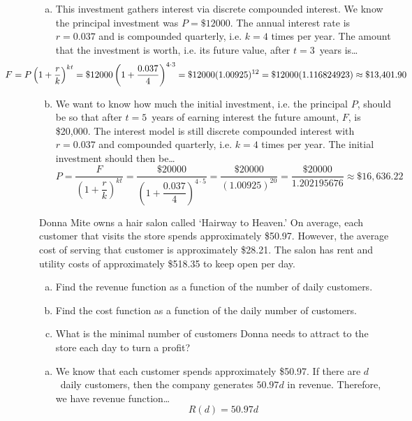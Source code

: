\documentclass[12pt,letterpaper]{exam}
\begin{document}
\begin{questions}
{\itshape
\sol 
\begin{enumerate}[(a)]
\item This investment gathers interest via discrete compounded interest. We know the principal investment was $P= \$12000$. The annual interest rate is $r= 0.037$ and is compounded quarterly, i.e. $k= 4$ times per year. The amount that the investment is worth, i.e. its future value, after $t= 3$~years is\dots
	\[
	\hspace{-2cm} F= P \left(1 + \dfrac{r}{k} \right)^{kt}= \$12000 \left(1 + \dfrac{0.037}{4} \right)^{4 \cdot 3}= \$12000 (1.00925)^{12}= \$12000(1.116824923) \approx \$13,\!401.90
	\] \pspace

\item We want to know how much the initial investment, i.e. the principal $P$, should be so that after $t= 5$~years of earning interest the future amount, $F$, is \$20,000. The interest model is still discrete compounded interest with $r= 0.037$ and compounded quarterly, i.e. $k= 4$ times per year. The initial investment should then be\dots
	\[
	P= \dfrac{F}{\left(1 + \dfrac{r}{k} \right)^{kt}}= \dfrac{\$20000}{\left(1 + \dfrac{0.037}{4} \right)^{4 \cdot 5}}= \dfrac{\$20000}{(1.00925)^{20}}= \dfrac{\$20000}{1.202195676} \approx \$16,\!636.22
	\]
\end{enumerate}
}



\newpage
\question[10] Donna Mite owns a hair salon called `Hairway to Heaven.' On average, each customer that visits the store spends approximately \$50.97. However, the average cost of serving that customer is approximately \$28.21. The salon has rent and utility costs of approximately \$518.35 to keep open per day. 
	\begin{enumerate}[(a)]
	\item Find the revenue function as a function of the number of daily customers. 
	\item Find the cost function as a function of the daily number of customers. 
	\item What is the minimal number of customers Donna needs to attract to the store each day to turn a profit? 
	\end{enumerate} \pspace

{\itshape
\sol 
\begin{enumerate}[(a)]
\item We know that each customer spends approximately \$50.97. If there are $d$~daily customers, then the company generates $50.97d$ in revenue. Therefore, we have revenue function\dots
	\[
	R(d)= 50.97d
	\] \pspace


\end{enumerate}}
\end{questions}
\end{document}
